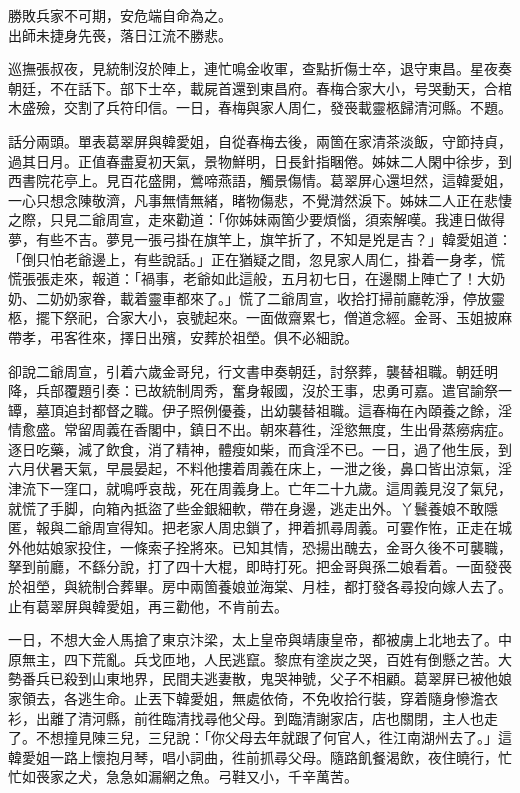 \begin{myquote}
勝敗兵家不可期，安危端自命為之。\\出師未捷身先䘮，落日江流不勝悲。
\end{myquote}

巡撫張叔夜，見統制沒於陣上，連忙鳴金收軍，查點折傷士卒，退守東昌。星夜奏朝廷，不在話下。部下士卒，載屍首還到東昌府。春梅合家大小，号哭動天，合棺木盛殮，交割了兵符印信。一日，春梅與家人周仁，發䘮載靈柩歸清河縣。不題。

話分兩頭。單表葛翠屏與韓愛姐，自從春梅去後，兩箇在家清茶淡飯，守節持貞，過其日月。正值春盡夏初天氣，景物鮮明，日長針指睏倦。姊妹二人閑中徐步，到西書院花亭上。見百花盛開，鶯啼燕語，觸景傷情。葛翠屏心還坦然，這韓愛姐，一心只想念陳敬濟，凡事無情無緒，睹物傷悲，不覺潸然淚下。{}姊妹二人正在悲悽之際，只見二爺周宣，走來勸道：「你姊妹兩箇少要煩惱，須索解嘆。我連日做得夢，有些不吉。夢見一張弓掛在旗竿上，旗竿折了，不知是兇是吉？」韓愛姐道：「倒只怕老爺邊上，有些說話。」正在猶疑之間，忽見家人周仁，掛着一身孝，慌慌張張走來，報道：「禍事，老爺如此這般，五月初七日，在邊關上陣亡了！大奶奶、二奶奶家眷，載着靈車都來了。」慌了二爺周宣，收拾打掃前廳乾淨，停放靈柩，擺下祭祀，合家大小，哀號起來。一面做齋累七，僧道念經。金哥、玉姐披麻帶孝，弔客徃來，擇日出殯，安葬於祖塋。俱不必細說。

卻說二爺周宣，引着六歲金哥兒，行文書申奏朝廷，討祭葬，襲替祖職。朝廷明降，兵部覆題引奏：已故統制周秀，奮身報國，沒於王事，忠勇可嘉。遣官諭祭一罈，墓頂追封都督之職。伊子照例優養，出幼襲替祖職。這春梅在內頤養之餘，淫情愈盛。常留周義在香閣中，鎮日不出。朝來暮徃，淫慾無度，生出骨蒸癆病症。逐日吃藥，減了飲食，消了精神，體瘦如柴，而貪淫不已。一日，過了他生辰，到六月伏暑天氣，早晨晏起，不料他摟着周義在床上，一泄之後，{}鼻口皆出涼氣，淫津流下一窪口，就鳴呼哀哉，死在周義身上。亡年二十九歲。{}這周義見沒了氣兒，就慌了手脚，向箱內抵盜了些金銀細軟，帶在身邊，逃走出外。丫鬟養娘不敢隱匿，報與二爺周宣得知。把老家人周忠鎖了，押着抓尋周義。可霎作恠，正走在城外他姑娘家投住，一條索子拴將來。已知其情，恐揚出醜去，金哥久後不可襲職，拏到前廳，不繇分說，打了四十大棍，即時打死。{}把金哥與孫二娘看着。一面發䘮於祖塋，與統制合葬畢。房中兩箇養娘並海棠、月桂，都打發各尋投向嫁人去了。止有葛翠屏與韓愛姐，再三勸他，不肯前去。

一日，不想大金人馬搶了東京汴梁，太上皇帝與靖康皇帝，都被虜上北地去了。中原無主，四下荒亂。兵戈匝地，人民逃竄。黎庶有塗炭之哭，百姓有倒懸之苦。大勢番兵已殺到山東地界，民間夫逃妻散，鬼哭神號，父子不相顧。葛翠屏已被他娘家領去，各逃生命。止丟下韓愛姐，無處依倚，不免收拾行裝，穿着隨身慘澹衣衫，出離了清河縣，前徃臨清找尋他父母。到臨清謝家店，店也關閉，主人也走了。不想撞見陳三兒，三兒說：「你父母去年就跟了何官人，徃江南湖州去了。」這韓愛姐一路上懷抱月琴，唱小詞曲，徃前抓尋父母。隨路飢餐渴飲，夜住曉行，忙忙如䘮家之犬，急急如漏網之魚。弓鞋又小，千辛萬苦。

